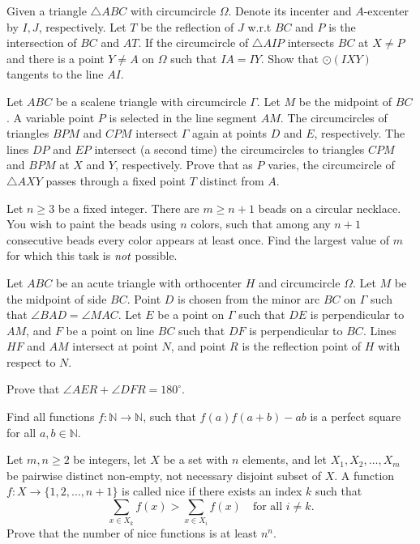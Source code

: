 \documentclass[11pt]{scrartcl}
\begin{document}
\begin{problem}[836909183133087]
Given a triangle $ \triangle{ABC} $ with circumcircle $ \Omega $. Denote its incenter and $ A $-excenter by $ I, J $, respectively. Let $ T $ be the reflection of $ J $ w.r.t $ BC $ and $ P $ is the intersection of $ BC $ and $ AT $. If the circumcircle of $ \triangle{AIP} $ intersects $ BC $ at $ X \neq P $ and there is a point $ Y \neq A $ on $ \Omega $ such that $ IA = IY $. Show that $ \odot\left(IXY\right) $ tangents to the line $ AI $.
\end{problem}
\begin{problem}[1700188229005727470]
Let $ABC$ be a scalene triangle with circumcircle $\Gamma$. Let $M$ be the midpoint of $BC$. A variable point $P$ is selected in the line segment $AM$. The circumcircles of triangles $BPM$ and $CPM$ intersect $\Gamma$ again at points $D$ and $E$, respectively. The lines $DP$ and $EP$ intersect (a second time) the circumcircles to triangles $CPM$ and $BPM$ at $X$ and $Y$, respectively. Prove that as $P$ varies, the circumcircle of $\triangle AXY$ passes through a fixed point $T$ distinct from $A$.
\end{problem}
\begin{problem}[822921222405372]
Let $n\ge 3$ be a fixed integer. There are $m\ge n+1$ beads on a circular necklace. You wish to paint the beads using $n$ colors, such that among any $n+1$ consecutive beads every color appears at least once. Find the largest value of $m$ for which this task is $\emph{not}$ possible.
\end{problem}
\begin{problem}[227919487650283]
Let $ABC$ be an acute triangle with orthocenter $H$ and circumcircle $\Omega$. Let $M$ be the midpoint of side $BC$. Point $D$ is chosen from the minor arc $BC$ on $\Gamma$ such that $\angle BAD = \angle MAC$. Let $E$ be a point on $\Gamma$ such that $DE$ is perpendicular to $AM$, and $F$ be a point on line $BC$ such that $DF$ is perpendicular to $BC$. Lines $HF$ and $AM$ intersect at point $N$, and point $R$ is the reflection point of $H$ with respect to $N$.

Prove that $\angle AER + \angle DFR = 180^\circ$.
\end{problem}
\begin{problem}[2583236079961296677]
	Find all functions $f:\mathbb{N} \rightarrow \mathbb{N}$, such that $f(a)f(a+b)-ab$ is a perfect square for all $a, b \in \mathbb{N}$.
\end{problem}
\begin{problem}[967014444176640]
Let $m,n \geqslant 2$ be integers, let $X$ be a set with $n$ elements, and let $X_1,X_2,\ldots,X_m$ be pairwise distinct non-empty, not necessary disjoint subset of $X$. A function $f \colon X \to \{1,2,\ldots,n+1\}$ is called nice if there exists an index $k$ such that\[\sum_{x \in X_k} f(x)>\sum_{x \in X_i} f(x) \quad \text{for all } i \ne k.\]Prove that the number of nice functions is at least $n^n$.
\end{problem}
\end{document}
